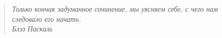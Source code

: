 \documentclass[a4paper,11pt]{book}
\begin{document}





	\backmatter



	{\normalbaselines\footnotesize\printindex}









\clearpage
\thispagestyle{empty}
\mbox{}\vfill

\begin{quote}\em
Только кончая задуманное сочинение, мы уясняем себе, с чего нам следовало его начать.\\[.3cm]
\mbox{}\hspace{\fill}\rm Блэз Паскаль
\end{quote}
\end{document}
